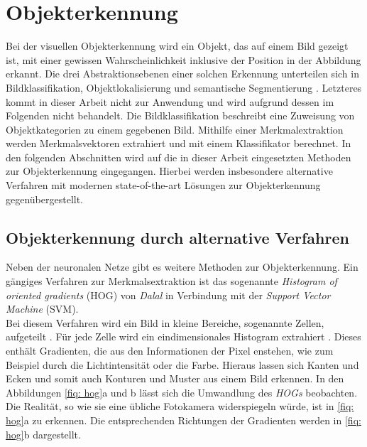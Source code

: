 	\section{Objekterkennung}
	\label{sec: Objekterkennung}
	Bei der visuellen Objekterkennung wird ein Objekt, das auf einem Bild gezeigt ist, mit einer gewissen Wahrscheinlichkeit inklusive der Position in der Abbildung erkannt. Die drei Abstraktionsebenen einer solchen Erkennung unterteilen sich in Bildklassifikation, Objektlokalisierung und semantische Segmentierung \cite{bildundobjekt}. Letzteres kommt in dieser Arbeit nicht zur Anwendung und wird aufgrund dessen im Folgenden nicht behandelt. Die Bildklassifikation beschreibt eine Zuweisung von Objektkategorien zu einem gegebenen Bild. Mithilfe einer Merkmalextraktion werden Merkmalsvektoren extrahiert und mit einem Klassifikator berechnet. In den folgenden Abschnitten wird auf die in dieser Arbeit eingesetzten Methoden zur Objekterkennung eingegangen. Hierbei werden insbesondere alternative Verfahren mit modernen state-of-the-art Lösungen zur Objekterkennung gegenübergestellt.  
	
	
		\subsection{Objekterkennung durch alternative Verfahren}
		\label{subsec: Objekterkennung durch alternative Verfahren}	
		
		
		Neben der neuronalen Netze gibt es weitere Methoden zur Objekterkennung. Ein gängiges Verfahren zur Merkmalsextraktion ist das sogenannte \textit{Histogram of oriented gradients} (HOG) von \textit{Dalal} in Verbindung mit der \textit{Support Vector Machine} (SVM).\\
		
		Bei diesem Verfahren wird ein Bild in kleine Bereiche, sogenannte Zellen, aufgeteilt \cite{hogsvm}. Für jede Zelle wird ein eindimensionales Histogram extrahiert \cite{hogsvm}. Dieses enthält Gradienten, die aus den Informationen der Pixel enstehen, wie zum Beispiel durch die Lichtintensität oder die Farbe. Hieraus lassen sich Kanten und Ecken und somit auch Konturen und Muster aus einem Bild erkennen. In den Abbildungen \ref{fiq: hog}a und b lässt sich die Umwandlung des \textit{HOGs} beobachten. Die Realität, so wie sie eine übliche Fotokamera widerspiegeln würde, ist in \ref{fiq: hog}a zu erkennen. Die entsprechenden Richtungen der Gradienten werden in \ref{fiq: hog}b dargestellt. \\
		
